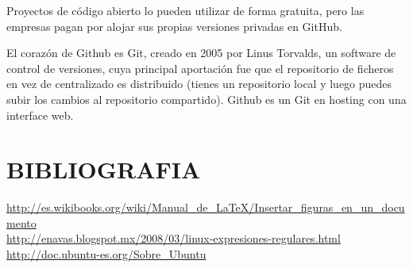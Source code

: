 \documentclass[12pt]{article}
\begin{document}
Proyectos de código abierto lo pueden utilizar de forma gratuita, pero las empresas pagan por alojar sus propias versiones privadas en GitHub.

El corazón de Github es Git, creado en 2005 por Linus Torvalds, un software de control de versiones, cuya principal aportación fue que el repositorio de ficheros en vez de centralizado es distribuido (tienes un repositorio local y luego puedes subir los cambios al repositorio compartido). Github es un Git en hosting con una interface web.\\


\section{BIBLIOGRAFIA}

\begin{thebibliography}{101}

 \url {http://es.wikibooks.org/wiki/Manual_de_LaTeX/Insertar_figuras_en_un_documento}\\
\url {http://enavas.blogspot.mx/2008/03/linux-expresiones-regulares.html}\\
 \url {http://doc.ubuntu-es.org/Sobre_Ubuntu}\\
\end{thebibliography}
\end{document}
